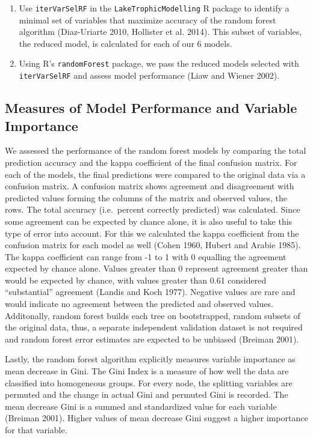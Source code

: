 \documentclass[11pt,]{article}
\begin{document}
\begin{enumerate}
\def\labelenumi{\arabic{enumi}.}
\itemsep1pt\parskip0pt
\item
  Use \texttt{iterVarSelRF} in the \texttt{LakeTrophicModelling} R
  package to identify a minimal set of variables that maximize accuracy
  of the random forest algorithm (Diaz-Uriarte 2010, Hollister et al.
  2014). This subset of variables, the reduced model, is calculated for
  each of our 6 models.
\item
  Using R's \texttt{randomForest} package, we pass the reduced models
  selected with \texttt{iterVarSelRF} and assess model performance (Liaw
  and Wiener 2002).
\end{enumerate}

\subsection{Measures of Model Performance and Variable
Importance}\label{measures-of-model-performance-and-variable-importance}

We assessed the performance of the random forest models by comparing the
total prediction accuracy and the kappa coefficient of the final
confusion matrix. For each of the models, the final predictions were
compared to the original data via a confusion matrix. A confusion matrix
shows agreement and disagreement with predicted values forming the
columns of the matrix and observed values, the rows. The total accuracy
(i.e.~percent correctly predicted) was calculated. Since some agreement
can be expected by chance alone, it is also useful to take this type of
error into account. For this we calculated the kappa coefficient from
the confusion matrix for each model as well (Cohen 1960, Hubert and
Arabie 1985). The kappa coefficient can range from -1 to 1 with 0
equalling the agreement expected by chance alone. Values greater than 0
represent agreement greater than would be expected by chance, with
values greater than 0.61 considered ``substantial'' agreement (Landis
and Koch 1977). Negative values are rare and would indicate no agreement
between the predicted and observed values. Additonally, random forest
builds each tree on bootstrapped, random subsets of the original data,
thus, a separate independent validation dataset is not required and
random forest error estimates are expected to be unbiased (Breiman
2001).

Lastly, the random forest algorithm explicitly measures variable
importance as mean decrease in Gini. The Gini Index is a measure of how
well the data are classified into homogeneous groups. For every node,
the splitting variables are permuted and the change in actual Gini and
permuted Gini is recorded. The mean decrease Gini is a summed and
standardized value for each variable (Breiman 2001). Higher values of
mean decrease Gini suggest a higher importance for that variable.
\end{document}
